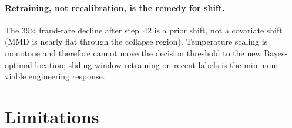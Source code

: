 \paragraph{Retraining, not recalibration, is the remedy for shift.}
The 39$\times$ fraud-rate decline after step~42 is a prior shift, not
a covariate shift (MMD is nearly flat through the collapse region).
Temperature scaling is monotone and therefore cannot move the
decision threshold to the new Bayes-optimal location; sliding-window
retraining on recent labels is the minimum viable engineering
response.

\FloatBarrier
\section{Limitations}
\label{sec:limitations}

